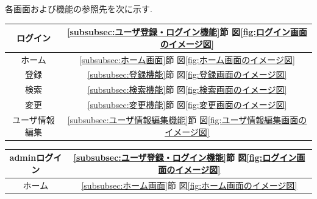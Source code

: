 \documentclass[11ptm]{jsarticle}
\begin{document}
各画面および機能の参照先を次に示す. \\
\begin{minipage}[t]{0.5\linewidth}
  \vspace{1zh}
  \begin{center}
    \begin{tabular}{c|c}
       ログイン & \ref{subsubsec:ユーザ登録・ログイン機能}節 図\ref{fig:ログイン画面のイメージ図} \\
       \hline
       ホーム & \ref{subsubsec:ホーム画面}節 図\ref{fig:ホーム画面のイメージ図} \\
       \hline
       登録 & \ref{subsubsec:登録機能}節 図\ref{fig:登録画面のイメージ図} \\
       \hline
       検索 & \ref{subsubsec:検索機能}節 図\ref{fig:検索画面のイメージ図} \\
       \hline
       変更 & \ref{subsubsec:変更機能}節 図\ref{fig:変更画面のイメージ図} \\
       \hline
       ユーザ情報編集 & \ref{subsubsec:ユーザ情報編集機能}節 図\ref{fig:ユーザ情報編集画面のイメージ図} \\
       \hline
    \end{tabular}
  \end{center}
\end{minipage}
%
\hfill
%
\begin{minipage}[t]{0.5\linewidth}
  \vspace{1zh}
  \begin{center}
    \begin{tabular}{c|c}
       adminログイン & \ref{subsubsec:ユーザ登録・ログイン機能}節 図\ref{fig:ログイン画面のイメージ図} \\
       \hline
       ホーム & \ref{subsubsec:ホーム画面}節 図\ref{fig:ホーム画面のイメージ図} \\
    \end{tabular}
  \end{center}
\end{minipage}

\clearpage
\end{document}
